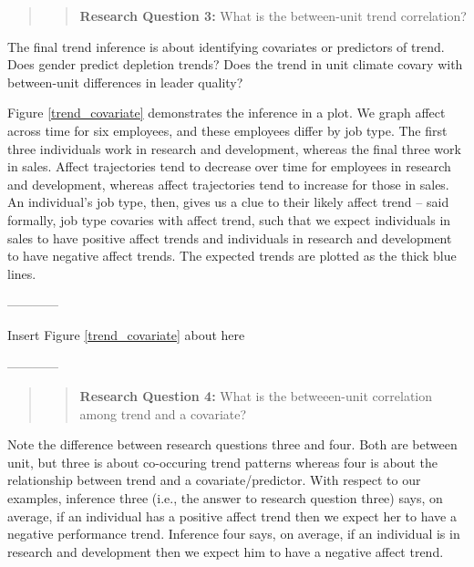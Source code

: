 \documentclass[english,,man]{apa6}
\theoremstyle{definition}
\theoremstyle{definition}
\theoremstyle{definition}
\theoremstyle{remark}
\begin{document}
\begin{quote}
\begin{quote}
\textbf{Research Question 3:} What is the between-unit trend
correlation?
\end{quote}
\end{quote}

The final trend inference is about identifying covariates or predictors
of trend. Does gender predict depletion trends? Does the trend in unit
climate covary with between-unit differences in leader quality?

Figure \ref{trend_covariate} demonstrates the inference in a plot. We
graph affect across time for six employees, and these employees differ
by job type. The first three individuals work in research and
development, whereas the final three work in sales. Affect trajectories
tend to decrease over time for employees in research and development,
whereas affect trajectories tend to increase for those in sales. An
individual's job type, then, gives us a clue to their likely affect
trend -- said formally, job type covaries with affect trend, such that
we expect individuals in sales to have positive affect trends and
individuals in research and development to have negative affect trends.
The expected trends are plotted as the thick blue lines.

\begin{center}

------------

Insert Figure \ref{trend_covariate} about here

------------

\end{center}

\begin{quote}
\begin{quote}
\textbf{Research Question 4:} What is the betweeen-unit correlation
among trend and a covariate?
\end{quote}
\end{quote}

Note the difference between research questions three and four. Both are
between unit, but three is about co-occuring trend patterns whereas four
is about the relationship between trend and a covariate/predictor. With
respect to our examples, inference three (i.e., the answer to research
question three) says, on average, if an individual has a positive affect
trend then we expect her to have a negative performance trend. Inference
four says, on average, if an individual is in research and development
then we expect him to have a negative affect trend.
\end{document}
